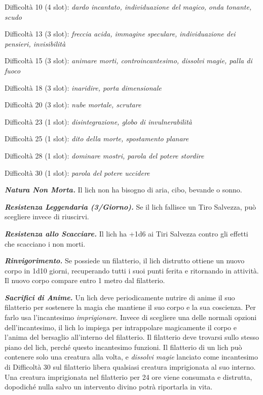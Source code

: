 \begin{multicols}{2}
Difficoltà 10 (4 slot): \emph{dardo incantato, individuazione del magico,} \emph{onda tonante, scudo}

Difficoltà 13 (3 slot): \emph{freccia acida, immagine speculare,} \emph{individuazione dei pensieri, invisibilità}

Difficoltà 15 (3 slot): \emph{animare morti, controincantesimo, dissolvi} \emph{magie, palla di fuoco}

Difficoltà 18 (3 slot): \emph{inaridire, porta dimensionale}

Difficoltà 20 (3 slot): \emph{nube mortale, scrutare}

Difficoltà 23 (1 slot): \emph{disintegrazione, globo di invulnerabilità}

Difficoltà 25 (1 slot): \emph{dito della morte, spostamento planare}

Difficoltà 28 (1 slot): \emph{dominare mostri, parola del potere stordire}

Difficoltà 30 (1 slot): \emph{parola del potere uccidere}

\emph{\textbf{Natura Non Morta.}} Il lich non ha bisogno di aria, cibo, bevande o sonno.

\emph{\textbf{Resistenza Leggendaria (3/Giorno).}} Se il lich fallisce un Tiro Salvezza, può scegliere invece di riuscirvi.

\emph{\textbf{Resistenza allo Scacciare.}} Il lich ha +1d6 ai Tiri Salvezza contro gli effetti che scacciano i non morti.

\emph{\textbf{Rinvigorimento.}} Se possiede un filatterio, il lich distrutto ottiene un nuovo corpo in 1d10 giorni, recuperando tutti i suoi punti ferita e ritornando in attività. Il nuovo corpo compare entro 1 metro dal filatterio.

\emph{\textbf{Sacrifici di Anime.}} Un lich deve periodicamente nutrire di anime il suo filatterio per sostenere la magia che mantiene il suo corpo e la sua coscienza. Per farlo usa l'incantesimo \emph{imprigionare}. Invece di scegliere una delle normali opzioni dell'incantesimo, il lich lo impiega per intrappolare magicamente il corpo e l'anima del bersaglio all'interno del filatterio. Il filatterio deve trovarsi sullo stesso piano del lich, perché questo incantesimo funzioni. Il filatterio di un lich può contenere solo una creatura alla volta, e \emph{dissolvi magie} lanciato come incantesimo di Difficoltà 30 sul filatterio libera qualsiasi creatura imprigionata al suo interno. Una creatura imprigionata nel filatterio per 24 ore viene consumata e distrutta, dopodiché nulla salvo un intervento divino potrà riportarla in vita.


\end{multicols}

